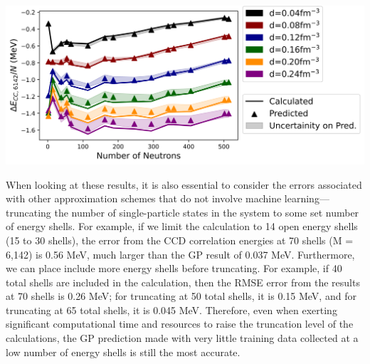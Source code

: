 \begin{center}
    \includegraphics[scale=0.75]{Images/Chapter7/NeutronMatter/GP_PNM_MSU_n_1_uncertainity.png}
    \label{pnm_mp_all}
\end{center}

When looking at these results, it is also essential to consider the errors associated with other approximation schemes that do not involve machine learning—truncating the number of single-particle states in the system to some set number of energy shells. For example, if we limit the calculation to 14 open energy shells (15 to 30 shells), the error from the CCD correlation energies at 70 shells (M = 6,142) is 0.56 MeV, much larger than the GP result of 0.037 MeV. Furthermore, we can place include more energy shells before truncating. For example, if 40 total shells are included in the calculation, then the RMSE error from the results at 70 shells is 0.26 MeV; for truncating at 50 total shells, it is 0.15 MeV, and for truncating at 65 total shells, it is 0.045 MeV.  Therefore, even when exerting significant computational time and resources to raise the truncation level of the calculations, the GP prediction made with very little training data collected at a low number of energy shells is still the most accurate.

